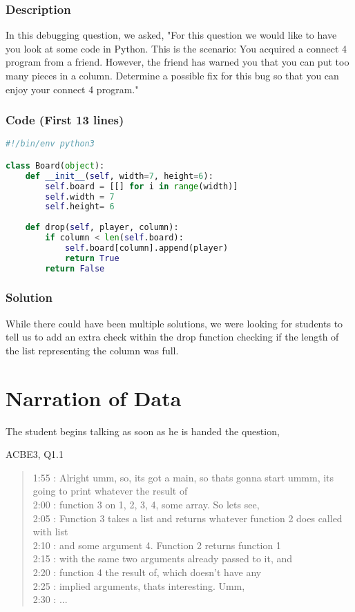 \documentclass{article}
\begin{document}
\subsubsection{Description}
In this debugging question, we asked, "For this question we would like to have you look at some code in Python. This is the scenario: You acquired a connect 4 program from a friend. However, the friend has warned you that you can put too many pieces in a column. Determine a possible fix for this bug so that you can enjoy your connect 4 program."
\subsubsection{Code (First 13 lines)}
\begin{lstlisting}[language=python]
#!/bin/env python3

class Board(object):
	def __init__(self, width=7, height=6):
		self.board = [[] for i in range(width)]
		self.width = 7
		self.height= 6
	
	def drop(self, player, column):
		if column < len(self.board):
			self.board[column].append(player)
			return True
		return False
\end{lstlisting}
\subsubsection{Solution}
While there could have been multiple solutions, we were looking for students to tell us to add an extra check within the drop function checking if the length of the list representing the column was full.

\section{Narration of Data}

The student begins talking as soon as he is handed the question,

ACBE3, Q1.1 \\
\begin{quote}
1:55 : Alright umm, so, its got a main, so thats gonna start ummm, its going to print whatever the result of \\
2:00 : function 3 on 1, 2, 3, 4, some array. So lets see, \\
2:05 : Function 3 takes a list and returns whatever function  2 does called with list \\
2:10 : and some argument 4. Function 2 returns function 1 \\
2:15 : with the same two arguments already passed to it, and \\
2:20 : function 4 the result of, which doesn't have any \\
2:25 : implied arguments, thats interesting. Umm, \\
2:30 : ... \\
\end{quote}
\end{document}
